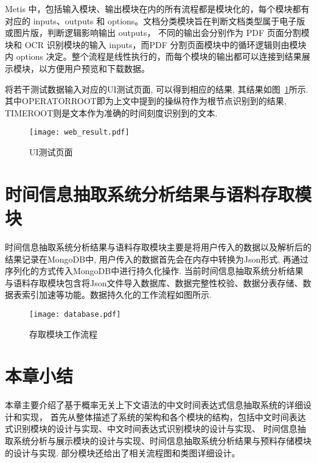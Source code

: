 Metis 中，包括输入模块、输出模块在内的所有流程都是模块化的，每个模块都有对应的 inputs、outputs 和 options。文档分类模块旨在判断文档类型属于电子版或图片版，判断逻辑影响输出 outputs，
不同的输出会分别作为 PDF 页面分割模块和 OCR 识别模块的输入 inputs，而PDF 分割页面模块中的循环逻辑则由模块内 options 决定。整个流程是线性执行的，而每个模块的输出都可以连接到结果展示模块，以方便用户预览和下载数据。

将若干测试数据输入对应的UI测试页面, 可以得到相应的结果, 其结果如图~\ref{fig:web_result}所示. 其中OPERATORROOT即为上文中提到的操纵符作为根节点识别到的结果, TIMEROOT则是文本作为准确的时间刻度识别到的文本.


\begin{figure}[h]
    \centering
    \texttt{[image: web\_result.pdf]}
    \caption{UI测试页面}
    \label{fig:web_result}
\end{figure}


\section{时间信息抽取系统分析结果与语料存取模块}


时间信息抽取系统分析结果与语料存取模块主要是将用户传入的数据以及解析后的结果记录在MongoDB中, 用户传入的数据首先会在内存中转换为Json形式, 再通过序列化的方式传入MongoDB中进行持久化操作. 
当前时间信息抽取系统分析结果与语料存取模块包含将Json文件导入数据库、数据完整性校验、数据分表存储、数据表索引加速等功能。数据持久化的工作流程如图所示.



\begin{figure}[h]
    \centering
    \texttt{[image: database.pdf]}
    \caption{存取模块工作流程}
    \label{fig:database}
\end{figure}






\section{本章小结}

本章主要介绍了基于概率无关上下文语法的中文时间表达式信息抽取系统的详细设计和实现，
首先从整体描述了系统的架构和各个模块的结构，包括中文时间表达式识别模块的设计与实现、中文时间表达式识别模块的设计与实现、
时间信息抽取系统分析与展示模块的设计与实现、时间信息抽取系统分析结果与预料存储模块的设计与实现.
部分模块还给出了相关流程图和类图详细设计。
